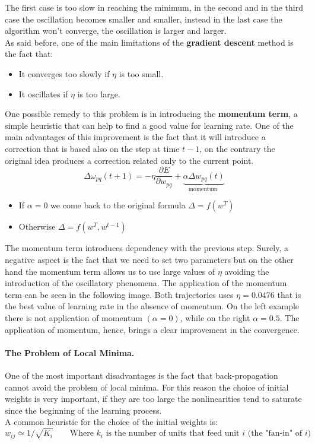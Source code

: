 The first case is too slow in reaching the minimum, in the second and in the third case the oscillation becomes smaller and smaller, instead in the last case the algorithm won't converge, the oscillation is larger and larger.\\
As said before, one of the main limitations of the \textbf{gradient descent} method is the fact that:
\begin{itemize}
	\item It converges too slowly if $\eta$ is too small.
	\item It oscillates if $\eta$ is too large.
\end{itemize}
One possible remedy to this problem is in introducing the \textbf{momentum term}, a simple heuristic that can help to find a good value for learning rate. One of the main advantages of this improvement is the fact that it will introduce a correction that is based also on the step at time $t-1$, on the contrary the original idea produces a correction related only to the current point.
$$\Delta \omega_{pq}(t+1) = -\eta \frac{\partial E}{\partial w_{pq}}+\underbrace{\alpha \Delta w_{pq} (t)}_{\text{momentum }}$$

\begin{itemize}
	\item If $\alpha = 0$ we come back to the original formula $\Delta = f(w^T)$
	\item Otherwise $\Delta = f(w^T, w^{t-1})$
\end{itemize}
The momentum term introduces dependency with the previous step. Surely, a negative aspect is the fact that we need to set two parameters but on the other hand the momentum term allows us to use large values of $\eta$ avoiding the introduction of the oscillatory phenomena. The application of the momentum term can be seen in the following image.
Both trajectories uses $\eta=0.0476$ that is the best value of learning rate in the absence of momentum. On the left example there is not application of momentum $(\alpha=0)$, while on the right $\alpha=0.5$. The application of momentum, hence, brings a clear improvement in the convergence.

\paragraph*{The Problem of Local Minima.} One of the most important disadvantages is the fact that back-propagation cannot avoid the problem of local minima. For this reason the choice of initial weights is very important, if they are too large the nonlinearities tend to saturate since the beginning of the learning process. \\
A common heuristic for the choice of the initial weights is: 
$$w_{ij} \simeq 1/\sqrt{K_i} \qquad \text{Where } k_i \text{ is the number of units that feed unit }i \text{ (the "fan-in" of }i \text{)}$$

